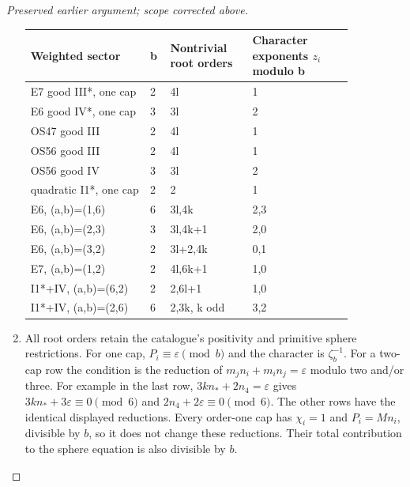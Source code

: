 \begin{proof}[Preserved earlier argument; scope corrected above]
\begin{enumerate}[label=\arabic*.]
\begin{center}\small\begin{tabular}{p{0.32\linewidth}p{0.04\linewidth}p{0.22\linewidth}p{0.27\linewidth}}\toprule
Weighted sector & b & Nontrivial root orders & Character exponents \(z_i\) modulo b\\
\midrule
E7 good III*, one cap & 2 & 4l & 1\\
E6 good IV*, one cap & 3 & 3l & 2\\
OS47 good III & 2 & 4l & 1\\
OS56 good III & 2 & 4l & 1\\
OS56 good IV & 3 & 3l & 2\\
quadratic I1*, one cap & 2 & 2 & 1\\
E6, (a,b)=(1,6) & 6 & 3l,4k & 2,3\\
E6, (a,b)=(2,3) & 3 & 3l,4k+1 & 2,0\\
E6, (a,b)=(3,2) & 2 & 3l+2,4k & 0,1\\
E7, (a,b)=(1,2) & 2 & 4l,6k+1 & 1,0\\
I1*+IV, (a,b)=(6,2) & 2 & 2,6l+1 & 1,0\\
I1*+IV, (a,b)=(2,6) & 6 & 2,3k, k odd & 3,2\\
\bottomrule\end{tabular}\end{center}

\item All root orders retain the catalogue's positivity and primitive
sphere restrictions. For one cap, \(P_i\equiv\varepsilon\pmod b\)
and the character is \(\zeta_b^{-1}\). For a two-cap row
the condition is the reduction of
\(m_jn_i+m_in_j=\varepsilon\) modulo two and/or three.
For example in the last row, \(3kn_*+2n_4=\varepsilon\)
gives \(3kn_*+3\varepsilon\equiv0\pmod6\) and
\(2n_4+2\varepsilon\equiv0\pmod6\). The other rows have
the identical displayed reductions. Every order-one cap has
\(\chi_i=1\) and \(P_i=Mn_i\), divisible by \(b\), so it
does not change these reductions. Their total contribution to
the sphere equation is also divisible by \(b\).


\end{enumerate}
\end{proof}
